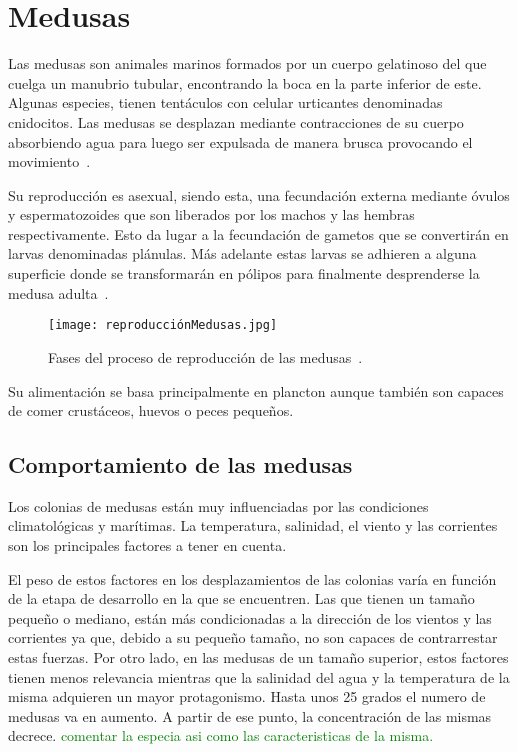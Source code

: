 

\section{Medusas}
Las medusas son animales marinos formados por un cuerpo gelatinoso del que cuelga un manubrio tubular, encontrando la boca en la parte inferior de este. Algunas especies, tienen tentáculos con celular urticantes denominadas cnidocitos. Las medusas se desplazan mediante contracciones de su cuerpo absorbiendo agua para luego ser expulsada de manera brusca provocando el movimiento~\cite{wiki:medusas}.

Su reproducción es asexual, siendo esta, una fecundación externa mediante óvulos y espermatozoides que son liberados por los machos y las hembras respectivamente. Esto da lugar a la fecundación de gametos que se convertirán en larvas denominadas plánulas. Más adelante estas larvas se adhieren a alguna superficie donde se transformarán en pólipos para finalmente desprenderse la medusa adulta~\cite{noauthor_reproduccion_2016}.


\begin{figure}%
	\centering
	\texttt{[image: reproducciónMedusas.jpg]}
	\caption[Fases del proceso de reproducción de las medusas]{Fases del proceso de reproducción de las medusas~\cite{reproduccionMedusas}.}
	\label{fases_medusas}
\end{figure}


Su alimentación se basa principalmente en plancton aunque también son capaces de comer crustáceos, huevos o peces pequeños.

\subsection{Comportamiento de las medusas}
Los colonias de medusas están muy influenciadas por las condiciones climatológicas y marítimas. La temperatura, salinidad, el viento y las corrientes son los principales factores a tener en cuenta.

El peso de estos factores en los desplazamientos de las colonias varía en función de la etapa de desarrollo en la que se encuentren. Las que tienen un tamaño pequeño o mediano, están más condicionadas a la dirección de los vientos y las corrientes ya que, debido a su pequeño tamaño, no son capaces de contrarrestar estas fuerzas. Por otro lado, en las medusas de un tamaño superior, estos factores tienen menos relevancia mientras que la salinidad del agua y la temperatura de la misma adquieren un mayor protagonismo. Hasta unos 25 grados el numero de medusas va en aumento. A partir de ese punto, la concentración de las mismas decrece.
\textcolor{green}{comentar la especia asi como las caracteristicas de la misma.}

